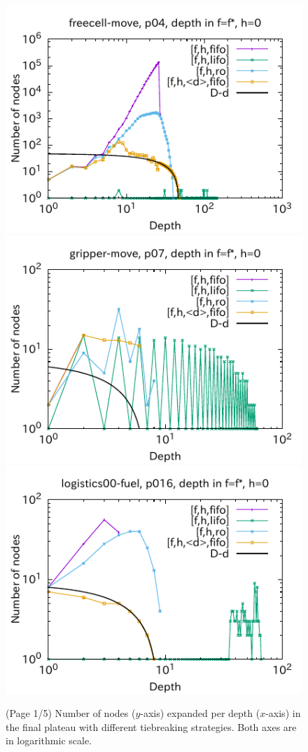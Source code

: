 \begin{figure}[htbp]
\includegraphics{img/output-lmcut/freecell-move/p04-0.pdf}
\includegraphics{img/output-lmcut/gripper-move/p07-0.pdf}
\includegraphics{img/output-lmcut/logistics00-fuel/p016-0.pdf}
 \caption{(Page 1/5) Number of nodes ($y$-axis) expanded per depth ($x$-axis) in
 the final plateau with different tiebreaking strategies. Both axes are in logarithmic scale.
 }
 \label{fig:depth-histogram}
\end{figure}

